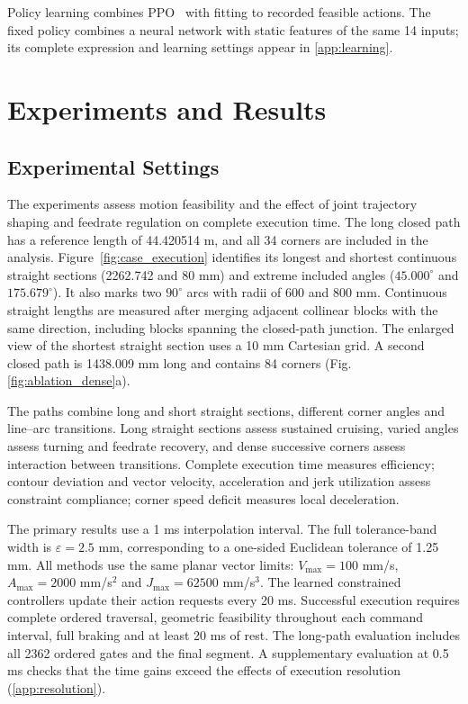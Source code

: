 \documentclass[preprint,12pt,nonatbib]{elsarticle}
\newcommand{\figref}[1]{Fig.\nobreakspace\ref{#1}}
\begin{document}
Policy learning combines PPO~\citep{Schulman2017PPO} with fitting to recorded feasible actions. The fixed policy combines a neural network with static features of the same 14 inputs; its complete expression and learning settings appear in \ref{app:learning}.

\section{Experiments and Results}
\label{sec:experiments}
\subsection{Experimental Settings}
The experiments assess motion feasibility and the effect of joint trajectory shaping and feedrate regulation on complete execution time. The long closed path has a reference length of 44.420514 m, and all 34 corners are included in the analysis. Figure~\ref{fig:case_execution} identifies its longest and shortest continuous straight sections (2262.742 and 80 mm) and extreme included angles ($45.000^\circ$ and $175.679^\circ$). It also marks two $90^\circ$ arcs with radii of 600 and 800 mm. Continuous straight lengths are measured after merging adjacent collinear blocks with the same direction, including blocks spanning the closed-path junction. The enlarged view of the shortest straight section uses a 10 mm Cartesian grid. A second closed path is 1438.009 mm long and contains 84 corners (\figref{fig:ablation_dense}a).

The paths combine long and short straight sections, different corner angles and line--arc transitions. Long straight sections assess sustained cruising, varied angles assess turning and feedrate recovery, and dense successive corners assess interaction between transitions. Complete execution time measures efficiency; contour deviation and vector velocity, acceleration and jerk utilization assess constraint compliance; corner speed deficit measures local deceleration.

The primary results use a 1 ms interpolation interval. The full tolerance-band width is $\varepsilon=2.5$ mm, corresponding to a one-sided Euclidean tolerance of 1.25 mm. All methods use the same planar vector limits: $V_{\max}=100$ mm/s, $A_{\max}=2000$ mm/s$^2$ and $J_{\max}=62500$ mm/s$^3$. The learned constrained controllers update their action requests every 20 ms. Successful execution requires complete ordered traversal, geometric feasibility throughout each command interval, full braking and at least 20 ms of rest. The long-path evaluation includes all 2362 ordered gates and the final segment. A supplementary evaluation at 0.5 ms checks that the time gains exceed the effects of execution resolution (\ref{app:resolution}).
\end{document}
